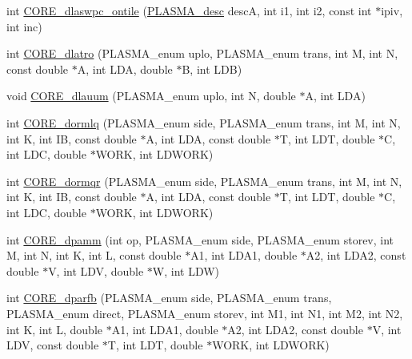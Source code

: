 \begin{DoxyCompactItemize}
\item 
int \hyperlink{group__CORE__double_gab49a7c8c5a269b2358ee568c559cc948_gab49a7c8c5a269b2358ee568c559cc948}{C\+O\+R\+E\+\_\+dlaswpc\+\_\+ontile} (\hyperlink{structplasma__desc__t}{P\+L\+A\+S\+M\+A\+\_\+desc} desc\+A, int i1, int i2, const int $\ast$ipiv, int inc)
\item 
int \hyperlink{group__CORE__double_ga164bb987707f2c51fafe19b1c630d5d3_ga164bb987707f2c51fafe19b1c630d5d3}{C\+O\+R\+E\+\_\+dlatro} (P\+L\+A\+S\+M\+A\+\_\+enum uplo, P\+L\+A\+S\+M\+A\+\_\+enum trans, int M, int N, const double $\ast$A, int L\+D\+A, double $\ast$B, int L\+D\+B)
\item 
void \hyperlink{group__CORE__double_ga7b1e511d379ee30b94e0b0baf0b66661_ga7b1e511d379ee30b94e0b0baf0b66661}{C\+O\+R\+E\+\_\+dlauum} (P\+L\+A\+S\+M\+A\+\_\+enum uplo, int N, double $\ast$A, int L\+D\+A)
\item 
int \hyperlink{group__CORE__double_ga041e33a314b8316c8ecfa37ed236d826_ga041e33a314b8316c8ecfa37ed236d826}{C\+O\+R\+E\+\_\+dormlq} (P\+L\+A\+S\+M\+A\+\_\+enum side, P\+L\+A\+S\+M\+A\+\_\+enum trans, int M, int N, int K, int I\+B, const double $\ast$A, int L\+D\+A, const double $\ast$T, int L\+D\+T, double $\ast$C, int L\+D\+C, double $\ast$W\+O\+R\+K, int L\+D\+W\+O\+R\+K)
\item 
int \hyperlink{group__CORE__double_ga88f757c9197146e057b433613021da79_ga88f757c9197146e057b433613021da79}{C\+O\+R\+E\+\_\+dormqr} (P\+L\+A\+S\+M\+A\+\_\+enum side, P\+L\+A\+S\+M\+A\+\_\+enum trans, int M, int N, int K, int I\+B, const double $\ast$A, int L\+D\+A, const double $\ast$T, int L\+D\+T, double $\ast$C, int L\+D\+C, double $\ast$W\+O\+R\+K, int L\+D\+W\+O\+R\+K)
\item 
int \hyperlink{group__CORE__double_ga321879836e956b6c8420ebb49db208e5_ga321879836e956b6c8420ebb49db208e5}{C\+O\+R\+E\+\_\+dpamm} (int op, P\+L\+A\+S\+M\+A\+\_\+enum side, P\+L\+A\+S\+M\+A\+\_\+enum storev, int M, int N, int K, int L, const double $\ast$A1, int L\+D\+A1, double $\ast$A2, int L\+D\+A2, const double $\ast$V, int L\+D\+V, double $\ast$W, int L\+D\+W)
\item 
int \hyperlink{group__CORE__double_gab9f985d68d7efaf1bbd811598c6eb987_gab9f985d68d7efaf1bbd811598c6eb987}{C\+O\+R\+E\+\_\+dparfb} (P\+L\+A\+S\+M\+A\+\_\+enum side, P\+L\+A\+S\+M\+A\+\_\+enum trans, P\+L\+A\+S\+M\+A\+\_\+enum direct, P\+L\+A\+S\+M\+A\+\_\+enum storev, int M1, int N1, int M2, int N2, int K, int L, double $\ast$A1, int L\+D\+A1, double $\ast$A2, int L\+D\+A2, const double $\ast$V, int L\+D\+V, const double $\ast$T, int L\+D\+T, double $\ast$W\+O\+R\+K, int L\+D\+W\+O\+R\+K)

\end{DoxyCompactItemize}
